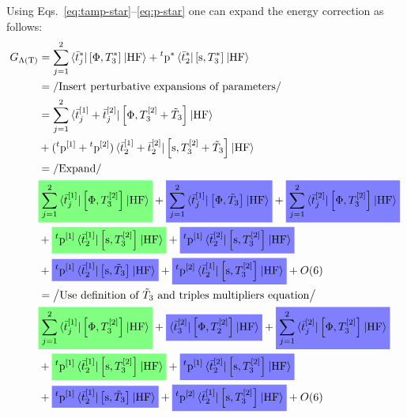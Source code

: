 Using Eqs.~\eqref{eq:tamp-star}--\eqref{eq:p-star} one can expand the
energy correction as follows:
\begin{equation}
  \begin{aligned}
  G_{\Lambda(\text{T})} &=
  \sum_{j=1}^2 \braket{\tbar{j}^{*} | \commutator{\Phi}{T_3^{*}} | \mathrm{HF}}
  + {}^t\p^{*}\braket{\tbar{2}^{*} | \commutator{\s}{T_3^{*}} | \mathrm{HF}} \\
  &= \left/ \text{Insert perturbative expansions of parameters} \right/ \\
  &=
  \sum_{j=1}^2 \braket{\tbar{j}^{[1]}+\tbar{j}^{[2]} |
  \commutator{\Phi}{T_3^{[2]} + \tilde{T}_3} | \mathrm{HF}} \\
  &+ ({}^t\p^{[1]} + {}^t\p^{[2]})
  \braket{\tbar{2}^{[1]} + \tbar{2}^{[2]} | \commutator{\s}{T_3^{[2]} + \tilde{T}_3} | \mathrm{HF}} \\
  &= \left/ \text{Expand} \right/ \\
  &\highlight{green}{
  \sum_{j=1}^2 \braket{\tbar{j}^{[1]} | \commutator{\Phi}{T_3^{[2]}} | \mathrm{HF}}
  }
  + \highlight{blue}{
  \sum_{j=1}^2 \braket{\tbar{j}^{[1]} | \commutator{\Phi}{\tilde{T}_3} | \mathrm{HF}}
  }
  + \highlight{blue}{
  \sum_{j=1}^2 \braket{\tbar{j}^{[2]} | \commutator{\Phi}{T_3^{[2]}} | \mathrm{HF}}
  } \\
  &+
  \highlight{green}{
  {}^t\p^{[1]} \braket{\tbar{2}^{[1]} | \commutator{\s}{T_3^{[2]}} | \mathrm{HF}}
  }
  + \highlight{blue}{
  {}^t\p^{[1]} \braket{\tbar{2}^{[2]} | \commutator{\s}{T_3^{[2]}} | \mathrm{HF}}
  } \\
  &+ \highlight{blue}{
  {}^t\p^{[1]} \braket{\tbar{2}^{[1]} | \commutator{\s}{\tilde{T}_3} | \mathrm{HF}}
  }
  + \highlight{blue}{
  {}^t\p^{[2]} \braket{\tbar{2}^{[1]} | \commutator{\s}{T_3^{[2]}} | \mathrm{HF}}
  }
  + O(6) \\
  &= \left/ \text{Use definition of $\tilde{T}_3$ and triples multipliers equation} \right/ \\
  &\highlight{green}{
  \sum_{j=1}^2 \braket{\tbar{j}^{[1]} | \commutator{\Phi}{T_3^{[2]}} | \mathrm{HF}}
  }
  + \highlight{blue}{
  \braket{\tbar{3}^{[2]} | \commutator{\Phi}{T_2^{[2]}} | \mathrm{HF}}
  }
  + \highlight{blue}{
  \sum_{j=1}^2 \braket{\tbar{j}^{[2]} | \commutator{\Phi}{T_3^{[2]}} | \mathrm{HF}}
  } \\
  &+
  \highlight{green}{
  {}^t\p^{[1]} \braket{\tbar{2}^{[1]} | \commutator{\s}{T_3^{[2]}} | \mathrm{HF}}
  }
  + \highlight{blue}{
  {}^t\p^{[1]} \braket{\tbar{2}^{[2]} | \commutator{\s}{T_3^{[2]}} | \mathrm{HF}}
  } \\
  &+ \highlight{blue}{
  {}^t\p^{[1]} \braket{\tbar{2}^{[1]} | \commutator{\s}{\tilde{T}_3} | \mathrm{HF}}
  }
  + \highlight{blue}{
  {}^t\p^{[2]} \braket{\tbar{2}^{[1]} | \commutator{\s}{T_3^{[2]}} | \mathrm{HF}}
  }
  + O(6) \\
  \end{aligned}
\end{equation}


